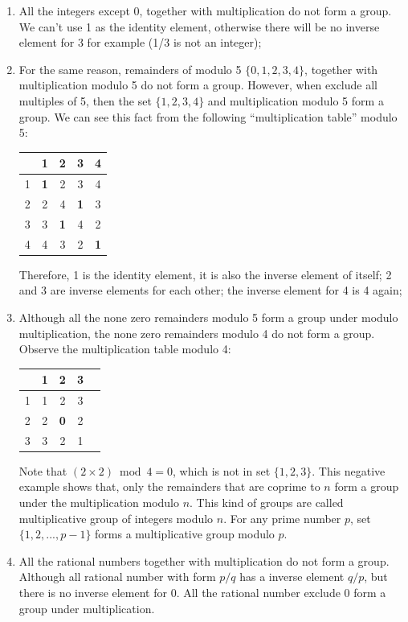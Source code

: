 \documentclass[b5paper]{article}
\begin{document}
\begin{enumerate}
\item All the integers except 0, together with multiplication do not form a group. We can't use 1 as the identity element, otherwise there will be no inverse element for 3 for example (1/3 is not an integer);

\item For the same reason, remainders of modulo 5 $\{0, 1, 2, 3, 4\}$, together with multiplication modulo 5 do not form a group. However, when exclude all multiples of 5, then the set $\{1, 2, 3, 4\}$ and multiplication modulo 5 form a group. We can see this fact from the following ``multiplication table'' modulo 5:

\vspace{5mm}
  \begin{tabular}{c|cccc}
    & 1 & 2 & 3 & 4 \\
  \hline
  1 & \textbf{1} & 2 & 3 & 4 \\
  2 & 2 & 4 & \textbf{1} & 3 \\
  3 & 3 & \textbf{1} & 4 & 2 \\
  4 & 4 & 3 & 2 & \textbf{1}
  \end{tabular}
\vspace{5mm}

Therefore, 1 is the identity element, it is also the inverse element of itself; 2 and 3 are inverse elements for each other; the inverse element for 4 is 4 again;

\item Although all the none zero remainders modulo 5 form a group under modulo multiplication, the none zero remainders modulo 4 do not form a group. Observe the multiplication table modulo 4:

\vspace{5mm}
  \begin{tabular}{c|cccc}
    & 1 & 2 & 3 \\
  \hline
  1 & 1 & 2 & 3 \\
  2 & 2 & \textbf{0} & 2 \\
  3 & 3 & 2 & 1 \\
  \end{tabular}
\vspace{5mm}

Note that $(2 \times 2) \bmod 4 = 0$, which is not in set $\{1, 2, 3\}$. This negative example shows that, only the remainders that are coprime to $n$ form a group under the multiplication modulo $n$. This kind of groups are called multiplicative group of integers modulo $n$. For any prime number $p$, set $\{1, 2, ..., p-1\}$ forms a multiplicative group modulo $p$.

\item All the rational numbers together with multiplication do not form a group. Although all rational number with form $p/q$ has a inverse element $q/p$, but there is no inverse element for 0. All the rational number exclude 0 form a group under multiplication.
\end{enumerate}
\end{document}
